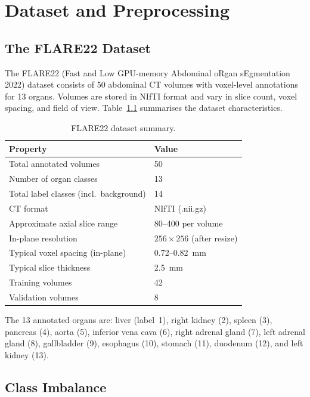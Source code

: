 \chapter{Dataset and Preprocessing}
\label{chap:data}

\section{The FLARE22 Dataset}

The FLARE22 (Fast and Low GPU-memory Abdominal oRgan sEgmentation 2022) dataset consists of
50 abdominal CT volumes with voxel-level annotations for 13 organs. Volumes are stored in
NIfTI format and vary in slice count, voxel spacing, and field of view. Table~\ref{tab:dataset}
summarises the dataset characteristics.

\begin{table}[h!]
\centering
\caption{FLARE22 dataset summary.}
\label{tab:dataset}
\begin{tabular}{ll}
\toprule
\textbf{Property} & \textbf{Value} \\
\midrule
Total annotated volumes          & 50 \\
Number of organ classes          & 13 \\
Total label classes (incl.\ background) & 14 \\
CT format                        & NIfTI (.nii.gz) \\
Approximate axial slice range    & 80--400 per volume \\
In-plane resolution              & $256 \times 256$ (after resize) \\
Typical voxel spacing (in-plane) & 0.72--0.82~mm \\
Typical slice thickness          & 2.5~mm \\
Training volumes                 & 42 \\
Validation volumes               & 8 \\
\bottomrule
\end{tabular}
\end{table}

\noindent
The 13 annotated organs are: liver (label~1), right kidney (2), spleen (3), pancreas (4),
aorta (5), inferior vena cava (6), right adrenal gland (7), left adrenal gland (8), gallbladder
(9), esophagus (10), stomach (11), duodenum (12), and left kidney (13).

\section{Class Imbalance}

